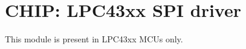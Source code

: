 \hypertarget{group___s_p_i__43_x_x}{}\section{C\+H\+IP\+: L\+P\+C43xx S\+PI driver}
\label{group___s_p_i__43_x_x}
This module is present in L\+P\+C43xx M\+C\+Us only. 